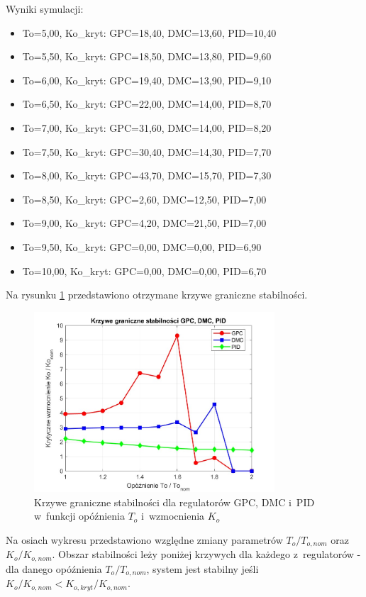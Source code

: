 \documentclass[a4paper,titlepage,11pt,floatssmall]{mwrep}
\begin{document}
Wyniki symulacji:
\begin{itemize}
    \item To=5,00, Ko\_kryt: GPC=18,40, DMC=13,60, PID=10,40
    \item To=5,50, Ko\_kryt: GPC=18,50, DMC=13,80, PID=9,60
    \item To=6,00, Ko\_kryt: GPC=19,40, DMC=13,90, PID=9,10
    \item To=6,50, Ko\_kryt: GPC=22,00, DMC=14,00, PID=8,70
    \item To=7,00, Ko\_kryt: GPC=31,60, DMC=14,00, PID=8,20
    \item To=7,50, Ko\_kryt: GPC=30,40, DMC=14,30, PID=7,70
    \item To=8,00, Ko\_kryt: GPC=43,70, DMC=15,70, PID=7,30
    \item To=8,50, Ko\_kryt: GPC=2,60, DMC=12,50, PID=7,00
    \item To=9,00, Ko\_kryt: GPC=4,20, DMC=21,50, PID=7,00
    \item To=9,50, Ko\_kryt: GPC=0,00, DMC=0,00, PID=6,90
    \item To=10,00, Ko\_kryt: GPC=0,00, DMC=0,00, PID=6,70
\end{itemize}

Na rysunku \ref{fig:stability} przedstawiono otrzymane krzywe graniczne stabilności.

\begin{figure}[H]
    \centering
    \includegraphics[width=0.8\textwidth]{kod/wykresy/GPC_DMC_PID_stabilnosc_Ko_vs_To.jpg}
    \caption{Krzywe graniczne stabilności dla regulatorów GPC, DMC i~PID w~funkcji opóźnienia $T_o$ i~wzmocnienia $K_o$}
    \label{fig:stability}
\end{figure}

Na osiach wykresu przedstawiono względne zmiany parametrów $T_o/T_{o,nom}$ oraz $K_o/K_{o,nom}$. Obszar stabilności leży poniżej krzywych dla każdego z~regulatorów - dla danego opóźnienia $T_o/T_{o,nom}$, system jest stabilny jeśli $K_o/K_{o,nom} < K_{o,kryt}/K_{o,nom}$.
\end{document}
